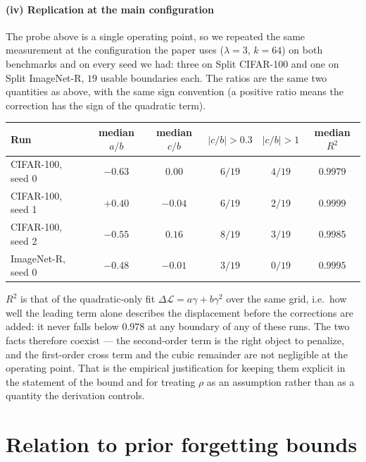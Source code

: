 \paragraph{(iv) Replication at the main configuration}
The probe above is a single operating point, so we repeated the same measurement at the
configuration the paper uses ($\lambda{=}3$, $k{=}64$) on both benchmarks and on every seed
we had: three on Split CIFAR-100 and one on Split ImageNet-R, $19$ usable boundaries each.
The ratios are the same two quantities as above, with the same sign convention (a positive
ratio means the correction has the sign of the quadratic term).

\begin{center}\footnotesize
\setlength{\tabcolsep}{4pt}
\begin{tabular}{@{}lccccc@{}}
\toprule
Run & median $a/b$ & median $c/b$ & $|c/b|>0.3$ & $|c/b|>1$ & median $R^2$ \\
\midrule
CIFAR-100, seed 0 & $-0.63$  & $0.00$  & $6/19$ & $4/19$ & $0.9979$ \\
CIFAR-100, seed 1 & $+0.40$  & $-0.04$ & $6/19$ & $2/19$ & $0.9999$ \\
CIFAR-100, seed 2 & $-0.55$  & $0.16$  & $8/19$ & $3/19$ & $0.9985$ \\
ImageNet-R, seed 0 & $-0.48$ & $-0.01$ & $3/19$ & $0/19$ & $0.9995$ \\
\bottomrule
\end{tabular}
\end{center}

$R^2$ is that of the quadratic-only fit $\Delta\mathcal{L}=a\gamma+b\gamma^2$ over the same
grid, i.e.\ how well the leading term alone describes the displacement before the
corrections are added: it never falls below $0.978$ at any boundary of any of these runs.
The two facts therefore coexist --- the second-order term is the right object to penalize,
and the first-order cross term and the cubic remainder are not negligible at the operating
point. That is the empirical justification for keeping them explicit in the statement of
the bound and for treating $\rho$ as an assumption rather than as a quantity the derivation
controls.

\section{Relation to prior forgetting bounds}
\label{app:prior_bounds}

